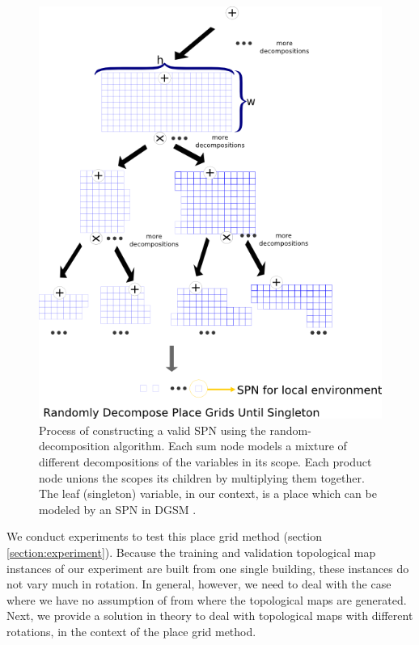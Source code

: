 \documentclass[11pt, titlepage]{article}
\theoremstyle{definition}
\begin{document}
\begin{figure}[!htb]
    \centering
    \captionsetup{width=.8\linewidth}
    \includegraphics[scale=0.6]{images/spn_grid.png}
    \caption{Process of constructing a valid SPN using the random-decomposition algorithm. Each sum node models a mixture of different decompositions of the variables in its scope. Each product node unions the scopes its children by multiplying them together. The leaf (singleton) variable, in our context, is a place which can be modeled by an SPN in DGSM \cite{pronobis2016learning}.}
    \label{fig:grid_learn}
\end{figure}

We conduct experiments to test this place grid method (section \ref{section:experiment}). Because the training and validation topological map instances of our experiment are built from one single building, these instances do not vary much in rotation. In general, however, we need to deal with the case where we have no assumption of from where the topological maps are generated. Next, we provide a solution in theory to deal with topological maps with different rotations, in the context of the place grid method.
\end{document}
